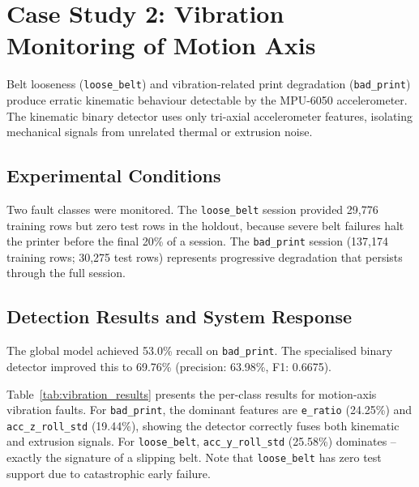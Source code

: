 \begin{table}[H]
\centering
\label{tab:nozzle_clogging_results}

\end{table}

\section{Case Study 2: Vibration Monitoring of Motion Axis}
\label{sec:cs2}

Belt looseness (\texttt{loose\_belt}) and vibration-related print degradation
(\texttt{bad\_print}) produce erratic kinematic behaviour detectable by the MPU-6050
accelerometer. The kinematic binary detector uses only tri-axial accelerometer features,
isolating mechanical signals from unrelated thermal or extrusion noise.

\subsection{Experimental Conditions}

Two fault classes were monitored. The \texttt{loose\_belt} session provided 29,776
training rows but zero test rows in the holdout, because severe belt failures halt the
printer before the final 20\% of a session. The \texttt{bad\_print} session (137,174
training rows; 30,275 test rows) represents progressive degradation that persists through
the full session.

\subsection{Detection Results and System Response}

The global model achieved 53.0\% recall on \texttt{bad\_print}. The specialised binary
detector improved this to 69.76\% (precision: 63.98\%, F1: 0.6675).

Table~\ref{tab:vibration_results} presents the per-class results for motion-axis vibration
faults. For \texttt{bad\_print}, the dominant features are \texttt{e\_ratio} (24.25\%) and
\texttt{acc\_z\_roll\_std} (19.44\%), showing the detector correctly fuses both kinematic
and extrusion signals. For \texttt{loose\_belt}, \texttt{acc\_y\_roll\_std} (25.58\%)
dominates -- exactly the signature of a slipping belt. Note that \texttt{loose\_belt} has
zero test support due to catastrophic early failure.

\begin{table}[H]
\centering
\caption{Motion-axis vibration fault detection results}
\label{tab:vibration_results}

\end{table}

